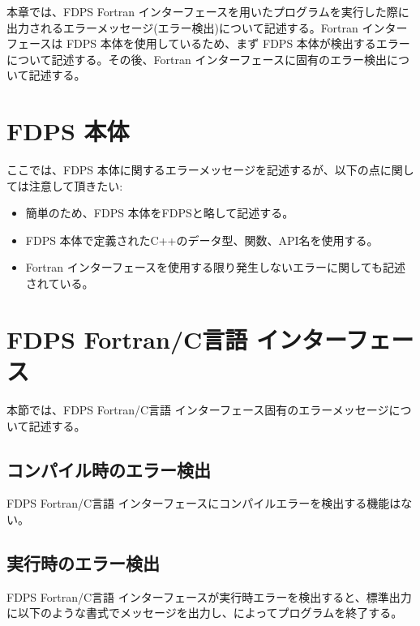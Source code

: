 本章では、FDPS Fortran インターフェースを用いたプログラムを実行した際に出力されるエラーメッセージ(エラー検出)について記述する。Fortran インターフェースは FDPS 本体を使用しているため、まず FDPS 本体が検出するエラーについて記述する。その後、Fortran インターフェースに固有のエラー検出について記述する。

\section{FDPS 本体}
\label{sec:err_msg:FDPS}
ここでは、FDPS 本体に関するエラーメッセージを記述するが、以下の点に関しては注意して頂きたい:
\begin{itemize}[leftmargin=*,itemsep=-1ex]
\item 簡単のため、FDPS 本体をFDPSと略して記述する。
\item FDPS 本体で定義されたC++のデータ型、関数、API名を使用する。
\item Fortran インターフェースを使用する限り発生しないエラーに関しても記述されている。
\end{itemize}



\section{FDPS Fortran/C言語 インターフェース}
\label{sec:err_msg:FDPS_ftn_if}
本節では、FDPS Fortran/C言語 インターフェース固有のエラーメッセージについて記述する。

\subsection{コンパイル時のエラー検出}
FDPS Fortran/C言語 インターフェースにコンパイルエラーを検出する機能はない。

\subsection{実行時のエラー検出}
FDPS Fortran/C言語 インターフェースが実行時エラーを検出すると、標準出力に以下のような書式でメッセージを出力し、によってプログラムを終了する。

